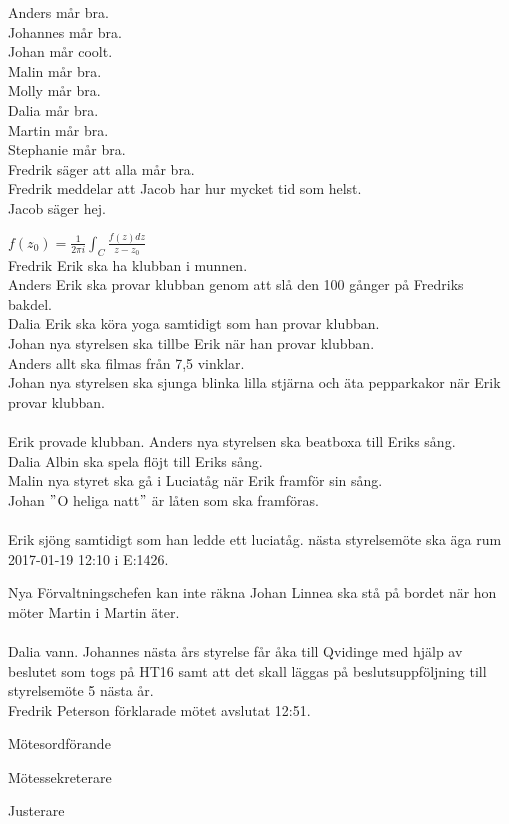 \documentclass[10pt]{article}
\def\mo{Fredrik Peterson}
\def\ms{Johan Karlberg}
\def\ji{Johannes Koch}
\begin{document}
\begin{paragrafer}
\begin{paragrafer}
Anders mår bra.\\
Johannes mår bra.\\
Johan mår coolt.\\
Malin mår bra.\\
Molly mår bra.\\
Dalia mår bra.\\
Martin mår bra.\\
Stephanie mår bra.\\
Fredrik säger att alla mår bra.\\
Fredrik meddelar att Jacob har hur mycket tid som helst.\\
Jacob säger hej.
\end{paragrafer}

$f(z_0) = \frac{1}{2\pi i} \int_C\frac{f(z)dz}{z-z_0}$\\
Fredrik \ypa Erik ska ha klubban i munnen.\\
Anders \ypa Erik ska provar klubban genom att slå den 100 gånger på Fredriks bakdel.\\
Dalia \ypa Erik ska köra yoga samtidigt som han provar klubban.\\
Johan \ypa nya styrelsen ska tillbe Erik när han provar klubban.\\
Anders \ypa allt ska filmas från 7,5 vinklar.\\
Johan \ypa nya styrelsen ska sjunga blinka lilla stjärna och äta pepparkakor när Erik provar klubban.\\
\Mbabay\\
Erik provade klubban.
Anders \ypa nya styrelsen ska beatboxa till Eriks sång.\\
Dalia \ypa Albin ska spela flöjt till Eriks sång.\\
Malin \ypa nya styret ska gå i Luciatåg när Erik framför sin sång.\\
Johan \ypa $"$O heliga natt$"$ är låten som ska framföras.\\
\Mbabay\\
Erik sjöng samtidigt som han ledde ett luciatåg.
{\Mba} nästa styrelsemöte ska äga rum 2017-01-19 12:10 i E:1426.

{\Ibfu}
Nya Förvaltningschefen kan inte räkna
Johan \ypa Linnea ska stå på bordet när hon möter Martin i Martin äter.\\
\Mbaby\\
Dalia vann.
Johannes \ypa nästa års styrelse får åka till Qvidinge med hjälp av beslutet som togs på HT16 samt att det skall läggas på beslutsuppföljning till styrelsemöte 5 nästa år.\\
\Mbaby
{}
{\mo} förklarade mötet avslutat 12:51.

\end{paragrafer}

\hidesignfoot
\begin{signatures}{3}
\signature{\mo}{Mötesordförande}
\signature{\ms}{Mötessekreterare}
\signature{\ji}{Justerare}
\end{signatures}
\end{document}
